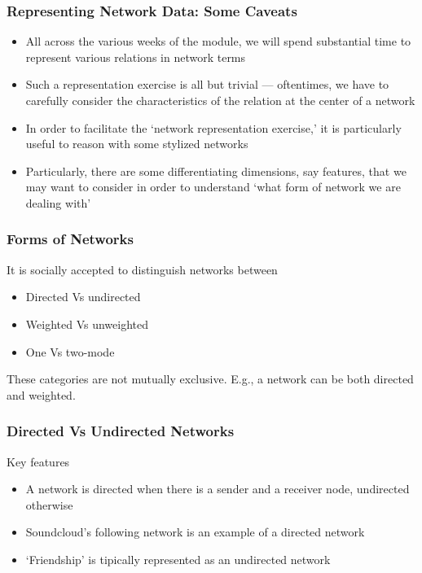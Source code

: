\documentclass[notes, aspectratio=1610]{beamer}
\begin{document}
\begin{frame}
	\frametitle{Representing Network Data: Some Caveats}
	\begin{itemize}
		\item 
		All across the various weeks of the module, we will spend substantial time to
		represent various relations in network terms 
		\item 
		Such a representation exercise is all but trivial --- oftentimes, we have to carefully
		consider the characteristics of the relation at the center of a network
		\item 
		In order to facilitate the `network representation exercise,' it is particularly useful
		to reason with some stylized networks
		\item 
		Particularly, there are some differentiating dimensions, say features, that we may want to consider 
		in order to understand `what form of network we are dealing with'
	\end{itemize}
\end{frame}

\begin{frame}
	\frametitle{Forms of Networks}
	It is socially accepted to distinguish networks between

	\begin{itemize}
		\item 
   		Directed Vs undirected
		\item
   		Weighted Vs unweighted
		\item  		
		One Vs two-mode
	\end{itemize}
	
	\vspace{1em}

	\begin{tcolorbox}[
		colback=comp_c!5!white,
		colframe=comp_c!90!black,
		title={\centering !! Pay attention !!}]
		These categories are not mutually exclusive. E.g., a network can be 
		both directed and weighted.
	\end{tcolorbox}
	
\end{frame}


\begin{frame}
	\frametitle{Directed Vs Undirected Networks}

	Key features

		\begin{itemize}
			\item A network is directed when there is a sender and a 
			receiver node, undirected otherwise
			\item Soundcloud's following network is an example of a
			directed network 
			\item `Friendship' is tipically represented as an undirected
			network
		\end{itemize}

\end{frame}
\end{document}
